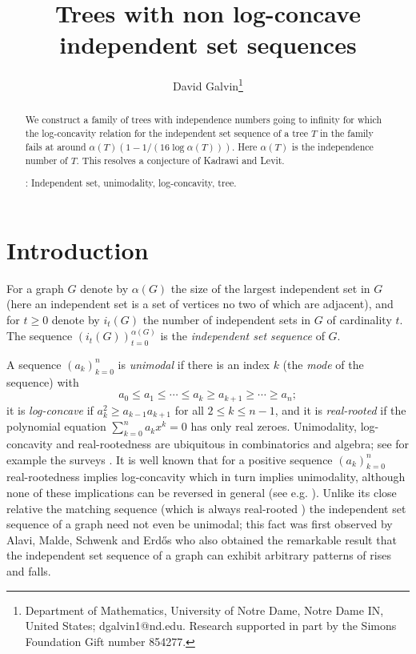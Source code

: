 \documentclass[12pt]{article}
\theoremstyle{definition}
\theoremstyle{definition}
\theoremstyle{definition}
\theoremstyle{definition}
\theoremstyle{definition}
\theoremstyle{definition}
\theoremstyle{definition}
\theoremstyle{definition}
\theoremstyle{remark}
\begin{document}
\title{Trees with non log-concave independent set sequences} 

\author{David Galvin\thanks{Department of Mathematics, University of Notre Dame, Notre Dame IN, United States; dgalvin1@nd.edu. Research supported in part by the Simons Foundation Gift number 854277.
}}

\maketitle

\begin{abstract}
We construct a family of trees with independence numbers going to infinity for which the log-concavity relation for the independent set sequence of a tree $T$ in the family fails at around $\alpha(T)\left(1-1/(16\log \alpha(T))\right)$. Here $\alpha(T)$ is the independence number of $T$. This resolves a conjecture of Kadrawi and Levit.

\vspace{2mm}

: Independent set, unimodality, log-concavity, tree.
\end{abstract}



\section{Introduction}

For a graph $G$ denote by $\alpha(G)$ the size of the largest independent set in $G$ (here an independent set is a set of vertices no two of which are adjacent), and for $t \geq 0$ denote by $i_t(G)$ the number of independent sets in $G$ of cardinality $t$. The sequence $(i_t(G))_{t=0}^{\alpha(G)}$ is the {\it independent set sequence} of $G$.

A sequence $(a_k)_{k=0}^n$ is {\it unimodal} if there is an index $k$ (the {\it mode} of the sequence) with 
$$
a_0 \leq a_1 \leq \cdots \leq a_k \geq a_{k+1} \geq \cdots \geq a_n;
$$
it is {\it log-concave} if $a_k^2 \geq a_{k-1}a_{k+1}$ for all $2 \leq k \leq n-1$, and it is {\it real-rooted} if the polynomial equation $\sum_{k=0}^n a_kx^k =0$ has only real zeroes. Unimodality, log-concavity and real-rootedness are ubiquitous in combinatorics and algebra; see for example the surveys \cite{B2015, B1994, S1989}. It is well known that for a positive sequence $(a_k)_{k=0}^n$ real-rootedness implies log-concavity which in turn implies unimodality, although none of these implications can be reversed in general (see e.g. \cite{B2016}). Unlike its close relative the matching sequence (which is always real-rooted \cite{HL1972}) the independent set sequence of a graph need not even be unimodal; this fact was first observed by Alavi, Malde, Schwenk and Erd\H{o}s \cite{AMSE1987} who also obtained the remarkable result that the independent set sequence of a graph can exhibit arbitrary patterns of rises and falls. 
\end{document}
